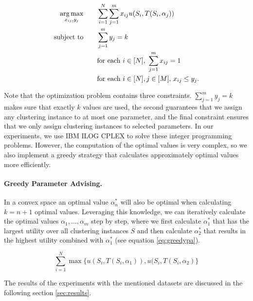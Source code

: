 \begin{align*}
  \operatorname*{arg\,max}_{x_{ij}, y_j} \qquad&\sum_{i = 1}^N \sum_{j = 1}^m x_{ij} u(S_i, T(S_i, \alpha_j)) \\
  \text{subject to} \qquad& \sum_{j=1}^m y_j = k \\
  & \text{for each $i \in [N]$, } \sum_{j=1}^m x_{ij} = 1 \\
  & \text{for each $i \in [N], j \in [M]$, } x_{ij} \leq y_j.
\end{align*}

Note that the optimization problem contains three constraints. $\sum_{j=1}^m y_j = k$ makes sure that exactly $k$ values are used, the second guarantees that we assign any clustering instance to at most one parameter, and the final constraint ensures that we only assign clustering instances to selected parameters. In our experiments, we use IBM ILOG CPLEX to solve these integer programming problems. However, the computation of the optimal values is very complex, so we also implement a greedy strategy that calculates approximately optimal values more efficiently.

\paragraph{Greedy Parameter Advising.} In a convex space an optimal value $\alpha_n^*$ will also be optimal when calculating $k = n + 1$ optimal values. Leveraging this knowledge, we can iteratively calculate the optimal values $\alpha_1, \dots, \alpha_m$ step by step, where we first calculate $\alpha_1^*$ that has the largest utility over all clustering instances $S$ and then calculate $\alpha_2^*$ that results in the highest utility combined with $\alpha_1^*$ (see equation \ref{eq:greedypa}).

\begin{equation}
\sum_{i=1}^N \max\{u(S_i, T(S_i, \alpha_1)), u(S_i, T(S_i, \alpha_2)\} 
\label{eq:greedypa}
\end{equation}

The results of the experiments with the mentioned datasets are discussed in the following section \ref{sec:results}.